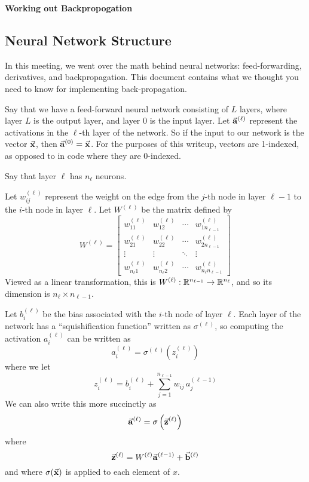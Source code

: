 \begin{center}
    \textbf{Working out Backpropogation}
\end{center}

\subsection{Neural Network Structure}

In this meeting, we went over the math behind neural networks: feed-forwarding,
derivatives, and backpropagation. This document contains what we thought you need to know 
for implementing back-propagation.

Say that we have a feed-forward neural network consisting of $L$ layers, where 
layer $L$ is the output layer, and layer $0$ is the input layer. Let $\vec{\mathbf{a}}^{(\ell)}$ represent the activations 
in the $\ell$-th layer of the network. So if the input to our network is the vector $\vec{\mathbf{x}}$, then $\vec{\mathbf{a}}^{(0)} = \vec{\mathbf{x}}$.
For the purposes of this writeup, vectors are 1-indexed, as opposed to in code where they are 0-indexed.

Say that layer $\ell$ has $n_\ell$ neurons.

Let $w_{ij}^{(\ell)}$ represent the weight on the edge from the $j$-th node in layer $\ell - 1$ to the $i$-th node in layer $\ell$.
Let $W^{(\ell)}$ be the matrix defined by 
\[
    W^{(\ell)} = \left[
        \begin{array}{cccc}
            w_{11}^{(\ell)} & w_{12}^{(\ell)} & \cdots & w_{1n_{\ell - 1}}^{(\ell)} \\
            w_{21}^{(\ell)} & w_{22}^{(\ell)} & \cdots & w_{2n_{\ell - 1}}^{(\ell)} \\
            \vdots          & \vdots          & \ddots & \vdots \\
            w_{n_\ell 1}^{(\ell)} & w_{n_\ell 2}^{(\ell)} & \cdots & w_{n_\ell n_{\ell - 1}}^{(\ell)}
        \end{array}
    \right]
\]
Viewed as a linear transformation, this is $W^{(\ell)}: \mathbb{R}^{n_{\ell - 1}} \to \mathbb{R}^{n_\ell}$, and so its dimension is $n_{\ell} \times n_{\ell - 1}$.

Let $b_i^{(\ell)}$ be the bias associated with the $i$-th node of layer $\ell$.
Each layer of the network has a ``squishification function'' written as $\sigma^{(\ell)}$, so computing the activation $a_i^{(\ell)}$ can 
be written as 
\[
    a_i^{(\ell)} = \sigma^{(\ell)} \left(
        z_i^{(\ell)}
    \right) 
\]
where we let 
\[
    z_i^{(\ell)} = b_i^{(\ell)} + \sum_{j = 1}^{n_{\ell - 1}} w_{ij} \, a_j^{(\ell - 1)}
\]
We can also write this more succinctly as  
\[
    \vec{\mathbf{a}}^{(\ell)} = \sigma\left( \vec{\mathbf{z}}^{(\ell)} \right)
\]
where \[
    \vec{\mathbf{z}}^{(\ell)} = W^{(\ell)} \vec{\mathbf{a}}^{(\ell - 1)} + \vec{\mathbf{b}}^{(\ell)}
\]
and where $\sigma(\vec{\mathbf{x}})$ is applied to each element of $x$.

